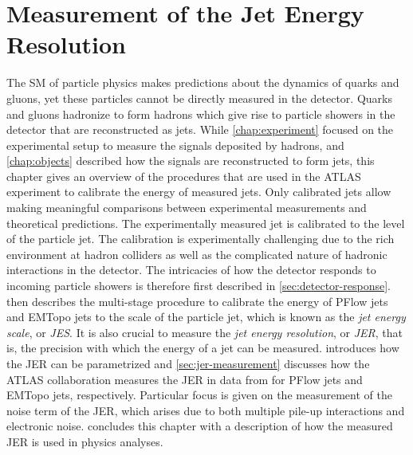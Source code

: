 \chapter{Measurement of the Jet Energy Resolution}
\label{chap:calibration}
The SM of particle physics makes predictions about the dynamics of quarks and gluons, yet these particles cannot be directly measured in the detector. Quarks and gluons hadronize to form hadrons which give rise to particle showers in the detector that are reconstructed as jets.
While \cref{chap:experiment} focused on the experimental setup to measure the signals deposited by hadrons, and \cref{chap:objects} described how the signals are reconstructed to form jets, this chapter gives an overview of the procedures that are used in the ATLAS experiment to calibrate the energy of measured jets. Only calibrated jets allow making meaningful comparisons between experimental measurements and theoretical predictions.
The experimentally measured jet is calibrated to the level of the particle jet. The calibration is experimentally challenging due to the rich environment at hadron colliders as well as the complicated nature of hadronic interactions in the detector. The intricacies of how the detector responds to incoming particle showers is therefore first described in \cref{sec:detector-response}.  then describes the multi-stage procedure to calibrate the energy of PFlow jets and EMTopo jets to the scale of the particle jet, which is known as the \emph{jet energy scale}, or \emph{JES}.
It is also crucial to measure the \emph{jet energy resolution}, or \emph{JER}, that is, the precision with which the energy of a jet can be measured.  introduces how the JER can be parametrized and \cref{sec:jer-measurement} discusses how the ATLAS collaboration measures the JER in data from \RunTwo for PFlow jets and EMTopo jets, respectively. Particular focus is given on the measurement of the noise term of the JER, which arises due to both multiple pile-up interactions and electronic noise.  concludes this chapter with a description of how the measured JER is used in physics analyses.

